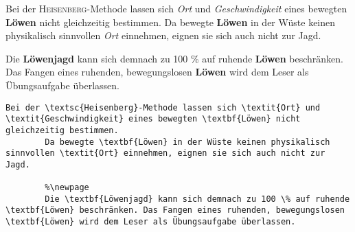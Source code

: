 \begin{frame}[fragile]
	\Losung
	\begin{outputbox}
		Bei der \textsc{Heisenberg}-Methode lassen sich \textit{Ort} und \textit{Geschwindigkeit} eines bewegten \textbf{Löwen} nicht gleichzeitig bestimmen. Da bewegte \textbf{Löwen} in der Wüste keinen physikalisch sinnvollen \textit{Ort} einnehmen, eignen sie sich auch nicht zur Jagd.
		
		Die \textbf{Löwenjagd} kann sich demnach zu 100 \% auf ruhende \textbf{Löwen} beschränken. Das Fangen eines ruhenden, bewegungslosen \textbf{Löwen} wird dem Leser als Übungsaufgabe überlassen.
	\end{outputbox}

	\Code
	\begin{lstlisting}[gobble=8]
		Bei der \textsc{Heisenberg}-Methode lassen sich \textit{Ort} und \textit{Geschwindigkeit} eines bewegten \textbf{Löwen} nicht gleichzeitig bestimmen.
		Da bewegte \textbf{Löwen} in der Wüste keinen physikalisch sinnvollen \textit{Ort} einnehmen, eignen sie sich auch nicht zur Jagd. 
		
		%\newpage
		Die \textbf{Löwenjagd} kann sich demnach zu 100 \% auf ruhende \textbf{Löwen} beschränken. Das Fangen eines ruhenden, bewegungslosen \textbf{Löwen} wird dem Leser als Übungsaufgabe überlassen.
	\end{lstlisting}
\end{frame}
